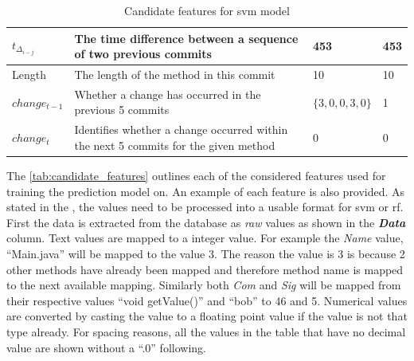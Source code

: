\begin{table}
\begin{center}
\begin{tabularx}{\linewidth}{|l|X|l|l|}
        $t_{\Delta_{i-j}}$ & The time difference between a sequence of two previous commits & 453 & 453 \\ \hline

        Length & The length of the method in this commit & 10 & 10 \\ \hline
        $change_{t-1}$ & Whether a change has occurred in the previous 5 commits & $\{3, 0, 0, 3, 0\}$ & 1 \\
        \hline
        $change_{t}$ & Identifies whether a change occurred within the next 5 commits for the given method & 0 & 0\\
        \hline
    \end{tabularx}
\end{center}
    \caption{Candidate features for \gls{svm} model}
    \label{tab:candidate_features}
\end{table}


The \autoref{tab:candidate_features} outlines each of the considered features used for training the prediction model on. An example of each feature is also provided. As stated in the , the values need to be processed into a usable format for \gls{svm} or \gls{rf}. First the data is extracted from the database as \textit{raw} values as shown in the \textit{\textbf{Data}} column. Text values are mapped to a integer value. For example the \textit{Name} value, ``Main.java'' will be mapped to the value 3. The reason the value is 3 is because 2 other methods have already been mapped and therefore method name is mapped to the next available mapping. Similarly both \textit{Com} and \textit{Sig} will be mapped from their respective values ``void getValue()'' and ``bob'' to 46 and 5. Numerical values are converted by casting the value to a floating point value if the value is not that type already. For spacing reasons, all the values in the table that have no decimal value are shown without a ``.0'' following.

